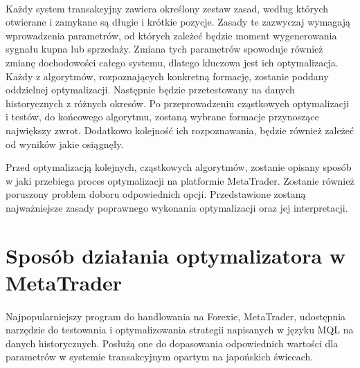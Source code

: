 \documentclass[pdflatex,11pt]{aghdpl}
\begin{document}
\paragraph{}
Każdy system transakcyjny zawiera określony zestaw zasad, według których otwierane i zamykane są długie i krótkie pozycje. Zasady te zazwyczaj wymagają wprowadzenia parametrów, od których zależeć będzie moment wygenerowania sygnału kupna lub sprzedaży. Zmiana tych parametrów spowoduje również zmianę dochodowości całego systemu, dlatego kluczowa jest ich optymalizacja. Każdy z algorytmów, rozpoznających konkretną formację, zostanie poddany oddzielnej optymalizacji. Następnie będzie przetestowany na danych historycznych z różnych okresów. Po przeprowadzeniu cząstkowych optymalizacji i testów, do końcowego algorytmu, zostaną wybrane formacje przynoszące największy zwrot. Dodatkowo kolejność ich rozpoznawania, będzie również zależeć od wyników jakie osiągnęły. 

Przed optymalizacją kolejnych, cząstkowych algorytmów, zostanie opisany sposób w jaki przebiega proces optymalizacji na platformie MetaTrader. Zostanie również poruszony problem doboru odpowiednich opcji. Przedstawione zostaną najważniejsze zasady poprawnego wykonania optymalizacji oraz jej interpretacji. 

\section{Sposób działania optymalizatora w MetaTrader}
\paragraph{}

Najpopularniejszy program do handlowania na Forexie, MetaTrader, udostępnia narzędzie do testowania i optymalizowania strategii napisanych w języku MQL na danych historycznych. Posłużą one do dopasowania odpowiednich wartości dla parametrów w systemie transakcyjnym opartym na japońskich świecach.
\end{document}

